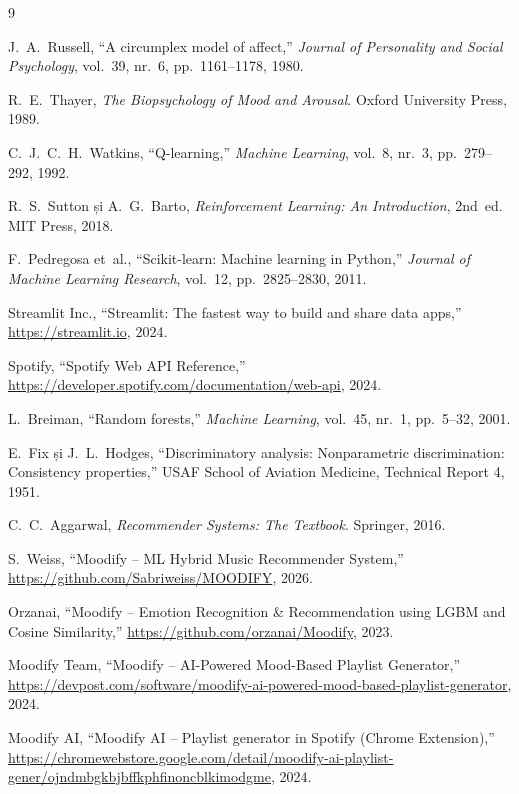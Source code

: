 \documentclass[12pt,a4paper]{article}
\begin{document}
\begin{thebibliography}{9}

J.\ A.\ Russell, ``A circumplex model of affect,'' \textit{Journal of Personality and Social Psychology}, vol.~39, nr.~6, pp.~1161--1178, 1980.

R.\ E.\ Thayer, \textit{The Biopsychology of Mood and Arousal}. Oxford University Press, 1989.

C.\ J.\ C.\ H.\ Watkins, ``Q-learning,'' \textit{Machine Learning}, vol.~8, nr.~3, pp.~279--292, 1992.

R.\ S.\ Sutton și A.\ G.\ Barto, \textit{Reinforcement Learning: An Introduction}, 2nd~ed. MIT Press, 2018.

F.\ Pedregosa et~al., ``Scikit-learn: Machine learning in Python,'' \textit{Journal of Machine Learning Research}, vol.~12, pp.~2825--2830, 2011.

Streamlit Inc., ``Streamlit: The fastest way to build and share data apps,'' \url{https://streamlit.io}, 2024.

Spotify, ``Spotify Web API Reference,'' \url{https://developer.spotify.com/documentation/web-api}, 2024.

L.\ Breiman, ``Random forests,'' \textit{Machine Learning}, vol.~45, nr.~1, pp.~5--32, 2001.

E.\ Fix și J.\ L.\ Hodges, ``Discriminatory analysis: Nonparametric discrimination: Consistency properties,'' USAF School of Aviation Medicine, Technical Report 4, 1951.

C.\ C.\ Aggarwal, \textit{Recommender Systems: The Textbook}. Springer, 2016.

S.\ Weiss, ``Moodify -- ML Hybrid Music Recommender System,'' \url{https://github.com/Sabriweiss/MOODIFY}, 2026.

Orzanai, ``Moodify -- Emotion Recognition \& Recommendation using LGBM and Cosine Similarity,'' \url{https://github.com/orzanai/Moodify}, 2023.

Moodify Team, ``Moodify -- AI-Powered Mood-Based Playlist Generator,'' \url{https://devpost.com/software/moodify-ai-powered-mood-based-playlist-generator}, 2024.

Moodify AI, ``Moodify AI -- Playlist generator in Spotify (Chrome Extension),'' \url{https://chromewebstore.google.com/detail/moodify-ai-playlist-gener/ojndmbgkbjbffkphfinoncblkimodgme}, 2024.

\end{thebibliography}
\end{document}
